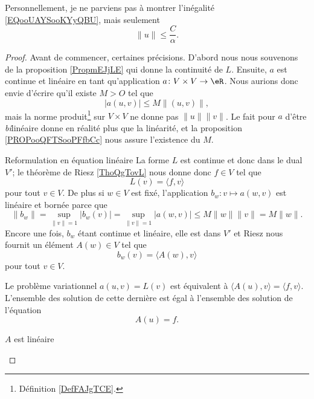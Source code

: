 \begin{probleme}
    Personnellement, je ne parviens pas à montrer l'inégalité \eqref{EQooUAYSooKYyQBU}, mais seulement
    \begin{equation}
        \| u \|\leq \frac{ C }{ \alpha }.
    \end{equation}
\end{probleme}

\begin{proof}
    Avant de commencer, certaines précisions. D'abord nous nous souvenons de la proposition \ref{PropmEJjLE} qui donne la continuité de \( L\). Ensuite, \( a\) est continue et linéaire en tant qu'application \( a\colon V\times V\to \eR\). Nous aurions donc envie d'écrire qu'il existe \( M>O\) tel que
    \begin{equation}
        | a(u,v) |\leq M\| (u,v) \|,
    \end{equation}
    mais la norme produit\footnote{Définition \ref{DefFAJgTCE}.} sur \( V\times V\) ne donne pas \( \| u \|\| v \|\). Le fait pour \( a\) d'être \emph{bi}linéaire donne en réalité plus que la linéarité, et la proposition \ref{PROPooQFTSooPFfbCc} nous assure l'existence du \( M\).

    \begin{subproof}
        \item[Reformulation en équation linéaire]
            La forme \( L\) est continue et donc dans le dual \( V'\); le théorème de Riesz \ref{ThoQgTovL} nous donne donc \( f\in V\) tel que
            \begin{equation}
                L(v)=\langle f, v\rangle 
            \end{equation}
            pour tout \( v\in V\). De plus si \( w\in V\) est fixé, l'application \( b_w\colon v\mapsto a(w,v)\) est linéaire et bornée parce que
            \begin{equation}
                \| b_w \|=\sup_{\| v \|=1}| b_w(v) |=\sup_{\| v \|=1}| a(w,v) |\leq M\| w \|\| v \|=M\| w \|.   
            \end{equation}
            Encore une fois, \( b_w\) étant continue et linéaire, elle est dans \( V'\) et Riesz nous fournit un élément \( A(w)\in V\) tel que
            \begin{equation}
                b_w(v)=\langle A(w), v\rangle 
            \end{equation}
            pour tout \( v\in V\). 

            Le problème variationnel \( a(u,v)=L(v)\) est équivalent à \( \langle A(u), v\rangle =\langle f, v\rangle \). L'ensemble des solution de cette dernière est égal à l'ensemble des solution de l'équation
            \begin{equation}        \label{EQooLPMPooMVuYUX}
                A(u)=f.
            \end{equation}
        \item[\( A\) est linéaire]


\end{subproof}
\end{proof}

